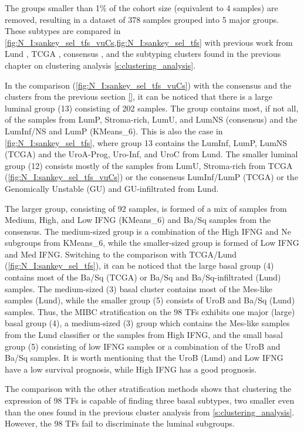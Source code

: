  
The groups smaller than 1\% of the cohort size (equivalent to 4 samples) are removed, resulting in a dataset of 378 samples grouped into 5 major groups. These subtypes are compared in \cref{fig:N_I:sankey_sel_tfs_vuCs,fig:N_I:sankey_sel_tfs} with previous work from Lund \citep{Marzouka2018-ge}, TCGA \citep{Robertson2017-mg}, consensus \citep{Kamoun2020-tj}, and the subtyping clusters found in the previous chapter on clustering analysis \cref{s:clustering_analysis}. 

In the comparison (\cref{fig:N_I:sankey_sel_tfs_vuCs}) with the consensus and the clusters from the previous section \ref{}, it can be noticed that there is a large luminal group (13) consisting of 202 samples. The group contains most, if not all, of the samples from LumP, Stroma-rich, LumU, and LumNS (consensus) and the LumInf/NS and LumP (KMeans\_6). This is also the case in \cref{fig:N_I:sankey_sel_tfs}, where group 13 contains the LumInf, LumP, LumNS (TCGA) and the UroA-Prog, Uro-Inf, and UroC from Lund. The smaller luminal group (12) consists mostly of the samples from LumU, Stroma-rich from TCGA (\cref{fig:N_I:sankey_sel_tfs_vuCs}) or the consensus LumInf/LumP (TCGA) or the Genomically Unstable (GU) and GU-infiltrated from Lund. 

The larger group, consisting of 92 samples, is formed of a mix of samples from Medium, High, and Low IFNG (KMeans\_6) and Ba/Sq samples from the consensus. The medium-sized group is a combination of the High IFNG and Ne subgroups from KMeans\_6, while the smaller-sized group is formed of Low IFNG and Med IFNG. Switching to the comparison with TCGA/Lund (\cref{fig:N_I:sankey_sel_tfs}), it can be noticed that the large basal group (4) contains most of the Ba/Sq (TCGA) or Ba/Sq and Ba/Sq-infiltrated (Lund) samples. The medium-sized (3) basal cluster contains most of the Mes-like samples (Lund), while the smaller group (5) consists of UroB and Ba/Sq (Lund) samples. Thus, the MIBC stratification on the 98 TFs exhibits one major (large) basal group (4), a medium-sized (3) group which contains the Mes-like samples from the Lund classifier or the samples from High IFNG, and the small basal group (5) consisting of low IFNG samples or a combination of the UroB and Ba/Sq samples. It is worth mentioning that the UroB (Lund) and Low IFNG have a low survival prognosis, while High IFNG has a good prognosis.

The comparison with the other stratification methods shows that clustering the expression of 98 TFs is capable of finding three basal subtypes, two smaller even than the ones found in the previous cluster analysis from \ref{s:clustering_analysis}. However, the 98 TFs fail to discriminate the luminal subgroups.


